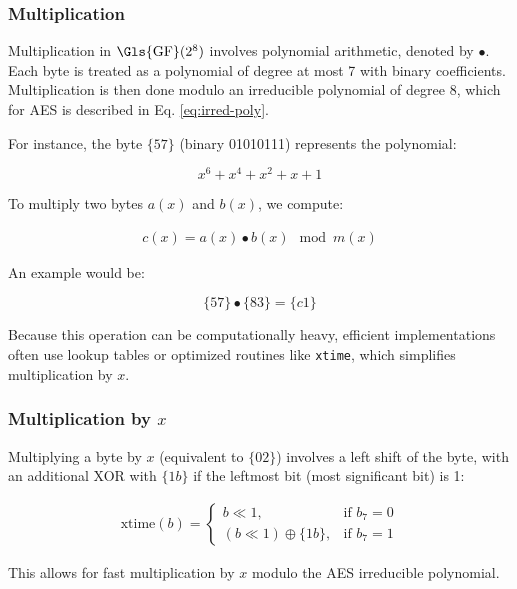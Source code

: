 \subsubsection{Multiplication}
\label{sec:multiplication}

Multiplication in $\mathrm{\Gls{GF}}(2^8)$ involves polynomial arithmetic, denoted by $\bullet$. 
Each byte is treated as a polynomial of degree at most 7 with binary coefficients. 
Multiplication is then done modulo an irreducible polynomial of degree 8, which for \Gls{AES} is described in Eq. \ref{eq:irred-poly}.

For instance, the byte $\{57\}$ (binary 01010111) represents the polynomial:

\[
x^6 + x^4 + x^2 + x + 1
\]

To multiply two bytes $a(x)$ and $b(x)$, we compute:

\begin{align}
    c(x) = a(x) \bullet b(x) \mod m(x) \label{eq:mul}
\end{align}

An example would be:

\[
\{57\} \bullet \{83\} = \{c1\}
\]

Because this operation can be computationally heavy, efficient implementations often use lookup tables or optimized routines like \texttt{xtime}, which simplifies multiplication by $x$.

\subsubsection{Multiplication by \texorpdfstring{$x$}{x}}
\label{sec:multx}

Multiplying a byte by $x$ (equivalent to $\{02\}$) involves a left shift of the byte, with an additional XOR with $\{1b\}$ if the leftmost bit (most significant bit) is 1:

\begin{align}
    \text{xtime}(b) =
    \begin{cases}
    b \ll 1, & \text{if } b_7 = 0 \\
    (b \ll 1) \oplus \{1b\}, & \text{if } b_7 = 1
    \end{cases}
\end{align}

This allows for fast multiplication by $x$ modulo the \Gls{AES} irreducible polynomial.
